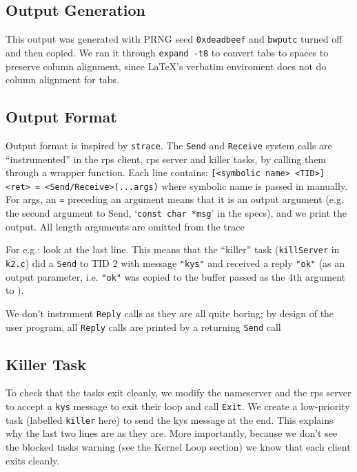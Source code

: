 \documentclass{article}
\begin{document}
\subsection*{Output Generation}

This output was generated with PRNG seed \texttt{0xdeadbeef} and \texttt{bwputc} turned off and then copied. We ran it through \texttt{expand -t8} to convert tabs to spaces to preserve column alignment, since \LaTeX's verbatim enviroment does not do column alignment for tabs.

\subsection*{Output Format}

Output format is inspired by \texttt{strace}. The \texttt{Send} and \texttt{Receive} system calls are ``instrumented'' in the rps client, rps server and killer tasks, by calling them through a wrapper function. Each line contains: \texttt{[<symbolic name> <TID>]  <ret> = <Send/Receive>(...args)} where symbolic name is passed in manually. For args, an \texttt{=} preceding an argument means that it is an output argument (e.g. the second argument to Send, `\texttt{const char *msg}' in the specs), and we print the output. All length arguments are omitted from the trace

For e.g.: look at the last line. This means that the ``killer'' task (\texttt{killServer} in \texttt{k2.c}) did a \texttt{Send} to TID 2 with message \texttt{"kys"} and received a reply \texttt{"ok"} (as an output parameter, i.e. \texttt{"ok"} was copied to the buffer passed as the 4th argument to ).

We don't instrument \texttt{Reply} calls as they are all quite boring; by design of the user program, all \texttt{Reply} calls are printed by a returning \texttt{Send} call

\subsection*{Killer Task}

To check that the tasks exit cleanly, we modify the nameserver and the rps server to accept a \texttt{kys} message to exit their loop and call \texttt{Exit}. We create a low-priority task (labelled \texttt{killer} here) to send the kys message at the end. This explains why the last two lines are as they are. More importantly, because we don't see the blocked tasks warning (see the Kernel Loop section) we know that each client exits cleanly.
\end{document}
